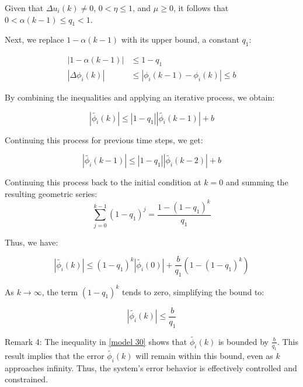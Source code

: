 \documentclass[journal,onecolumn]{IEEEtran}
\begin{document}
Given that \(\Delta u_i(k) \neq 0\), \(0 < \eta \leq 1\), and \(\mu \geq 0\), it follows that \(0 < \alpha(k-1) \leq q_1 < 1\).

Next, we replace \(1 - \alpha(k-1)\) with its upper bound, a constant \(q_1\):

\begin{align}
\label{model 26}
|1 - \alpha(k-1)| &\leq 1 - q_1 \\
|\Delta \phi_i(k)| &\leq |\phi_i(k-1) - \phi_i(k)| \leq b
\end{align}

By combining the inequalities and applying an iterative process, we obtain:

\begin{equation}
\label{model 27}
|\tilde{\phi_i}(k)| \leq |1 - q_1| |\tilde{\phi_i}(k-1)| + b
\end{equation}

Continuing this process for previous time steps, we get:

\begin{equation}
\label{model 28}
|\tilde{\phi_i}(k-1)| \leq |1 - q_1| |\tilde{\phi_i}(k-2)| + b
\end{equation}

Continuing this process back to the initial condition at \(k=0\) and summing the resulting geometric series:
\[
\sum_{j=0}^{k-1} (1-q_1)^j = \frac{1-(1-q_1)^k}{q_1}
\]

Thus, we have:

\begin{equation}
\label{model 29}
|\tilde{\phi_i}(k)| \leq (1 - q_1)^k |\tilde{\phi_i}(0)| + \frac{b}{q_1} (1 - (1 - q_1)^k)
\end{equation}

As \(k \rightarrow \infty\), the term \((1-q_1)^k\) tends to zero, simplifying the bound to:

\begin{equation}
\label{model 30}
|\tilde{\phi_i}(k)| \leq \frac{b}{q_1}
\end{equation}



Remark 4: The inequality in \eqref{model 30} shows that \(\tilde{\phi_i}(k)\) is bounded by \(\frac{b}{q_1}\). This result implies that the error \(\tilde{\phi_i}(k)\) will remain within this bound, even as \(k\) approaches infinity. Thus, the system's error behavior is effectively controlled and constrained.
\end{document}
